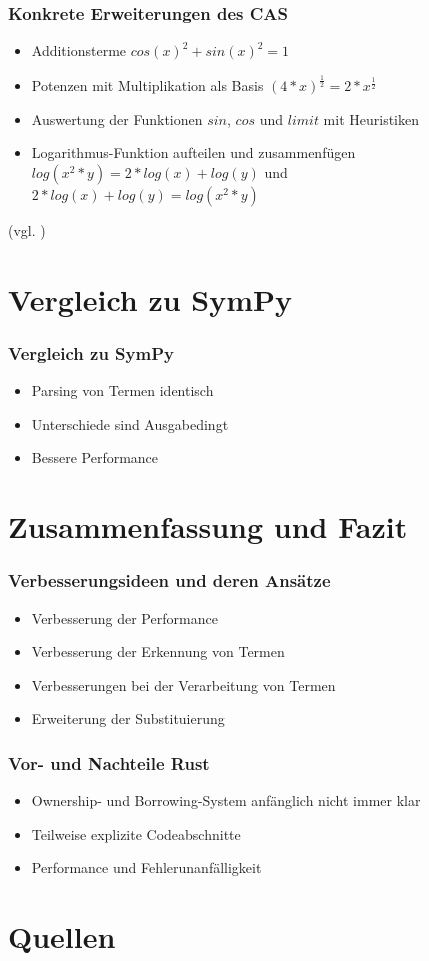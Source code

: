 \documentclass{beamer}
\begin{document}
\begin{frame}[fragile]
  \frametitle{Konkrete Erweiterungen des CAS}
  \begin{itemize}
    \item Additionsterme $cos(x)^2+sin(x)^2 = 1$
    \pause
    \item Potenzen mit Multiplikation als Basis $(4*x)^\frac{1}{2} = 2 * x^\frac{1}{2}$
    \pause
    \item Auswertung der Funktionen $sin$, $cos$ und $limit$ mit Heuristiken
    \pause
    \item Logarithmus-Funktion aufteilen und zusammenfügen $log(x^2*y) = 2*log(x)+log(y)$ und $2*log(x)+log(y) = log(x^2*y)$
  \end{itemize}
  {\small (vgl. \cite{WhyRust})}
\end{frame}

\section{Vergleich zu SymPy}
\begin{frame}[fragile]
  \frametitle{Vergleich zu SymPy}
  \begin{itemize}
    \item Parsing von Termen identisch
    \pause
    \item Unterschiede sind Ausgabedingt
    \pause
    \item Bessere Performance
  \end{itemize}
\end{frame}

\section{Zusammenfassung und Fazit}
\begin{frame}[fragile]
  \frametitle{Verbesserungsideen und deren Ansätze}
  \begin{itemize}
    \item Verbesserung der Performance
    \pause
    \item Verbesserung der Erkennung von Termen
    \pause
    \item Verbesserungen bei der Verarbeitung von Termen
    \pause
    \item Erweiterung der Substituierung
  \end{itemize}
\end{frame}

\begin{frame}[fragile]
  \frametitle{Vor- und Nachteile Rust}
  \begin{itemize}
    \item Ownership- und Borrowing-System anfänglich nicht immer klar
    \pause
    \item Teilweise explizite Codeabschnitte
    \pause
    \item Performance und Fehlerunanfälligkeit
  \end{itemize}
\end{frame}

\section{Quellen}
\begin{frame}
  
  \raggedright
  
\end{frame}
\end{document}
